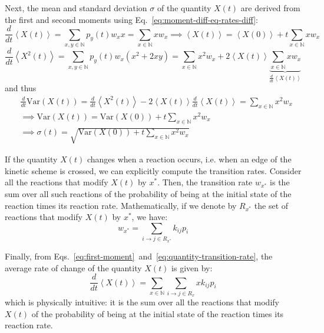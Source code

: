     Next, the mean and standard deviation $\sigma$ of the quantity $X(t)$ are derived from the first and second moments using Eq.~\eqref{eq:moment-diff-eq-rates-diff}:
    \begin{equation}
    \label{eq:first-moment}
        \frac{d}{dt}\left\langle X(t) \right\rangle
        = \sum_{x,y\in\mathbb{N}} p_y(t) w_{x} x
        = \sum_{x\in\mathbb{N}} x w_{x}
        \implies \left\langle X(t) \right\rangle = \left\langle X(0) \right\rangle + t \sum_{x\in\mathbb{N}} x w_{x}
    \end{equation}
    \begin{equation}
    \label{eq:second-moment}
        \frac{d}{dt}\left\langle X^2(t) \right\rangle
        = \sum_{x,y\in\mathbb{N}} p_y(t) w_{x} \left(x^2 + 2xy\right)
        = \sum_{x\in\mathbb{N}} x^2 w_{x} + 2 \left\langle X(t) \right\rangle \underbrace{\sum_{x\in\mathbb{N}} x w_{x}}_{\frac{d}{dt}\left\langle X(t) \right\rangle}
    \end{equation}
    and thus
    \begin{equation}
    \begin{split}
    \label{eq:variance-and-std}
        &\frac{d}{dt}\text{Var}(X(t))
        = \frac{d}{dt}\left\langle X^2(t) \right\rangle - 2 \left\langle X(t) \right\rangle \frac{d}{dt}\left\langle X(t) \right\rangle
        = \sum_{x\in\mathbb{N}} x^2 w_{x} \\
        &\implies \text{Var}(X(t)) = \text{Var}(X(0)) + t \sum_{x\in\mathbb{N}} x^2 w_{x} \\
        &\implies \sigma(t) = \sqrt{\text{Var}(X(0)) + t \sum_{x\in\mathbb{N}} x^2 w_{x}}
    \end{split}
    \end{equation}
    
    If the quantity $X(t)$ changes when a reaction occurs, i.e. when an edge of the kinetic scheme is crossed, we can explicitly compute the transition rates. Consider all the reactions that modify $X(t)$ by $x^*$. Then, the transition rate $w_{x^*}$ is the sum over all such reactions of the probability of being at the initial state of the reaction times its reaction rate. Mathematically, if we denote by $R_{x^*}$ the set of reactions that modify $X(t)$ by $x^*$, we have:
    \begin{equation}
    \label{eq:quantity-transition-rate}
        w_{x^*} = \sum_{i\to j\in R_{x^*}} k_{ij} p_i
    \end{equation}
    
    Finally, from Eqs.~\eqref{eq:first-moment}~and~\eqref{eq:quantity-transition-rate}, the average rate of change of the quantity $X(t)$ is given by:
    \begin{equation}
    \label{eq:quantity-rate-of-change}
        \frac{d}{dt}\left\langle X(t) \right\rangle
        = \sum_{x\in\mathbb{N}} \sum_{i\to j\in R_{x}} x k_{ij} p_i
    \end{equation}
    which is physically intuitive: it is the sum over all the reactions that modify $X(t)$ of the probability of being at the initial state of the reaction times its reaction rate.

